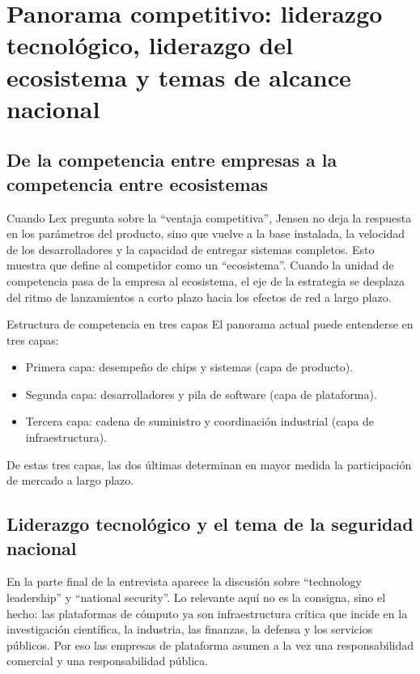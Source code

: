 \section{Panorama competitivo: liderazgo tecnológico, liderazgo del ecosistema y temas de alcance nacional}

\subsection{De la competencia entre empresas a la competencia entre ecosistemas}

Cuando Lex pregunta sobre la ``ventaja competitiva'', Jensen no deja la respuesta en los parámetros del producto, sino que vuelve a la base instalada, la velocidad de los desarrolladores y la capacidad de entregar sistemas completos. Esto muestra que define al competidor como un ``ecosistema''. Cuando la unidad de competencia pasa de la empresa al ecosistema, el eje de la estrategia se desplaza del ritmo de lanzamientos a corto plazo hacia los efectos de red a largo plazo.

\begin{knowledgebox}{Estructura de competencia en tres capas}
El panorama actual puede entenderse en tres capas:
\begin{itemize}
    \item Primera capa: desempeño de chips y sistemas (capa de producto).
    \item Segunda capa: desarrolladores y pila de software (capa de plataforma).
    \item Tercera capa: cadena de suministro y coordinación industrial (capa de infraestructura).
\end{itemize}
De estas tres capas, las dos últimas determinan en mayor medida la participación de mercado a largo plazo.
\end{knowledgebox}

\subsection{Liderazgo tecnológico y el tema de la seguridad nacional}

En la parte final de la entrevista aparece la discusión sobre ``technology leadership'' y ``national security''. Lo relevante aquí no es la consigna, sino el hecho: las plataformas de cómputo ya son infraestructura crítica que incide en la investigación científica, la industria, las finanzas, la defensa y los servicios públicos. Por eso las empresas de plataforma asumen a la vez una responsabilidad comercial y una responsabilidad pública.

